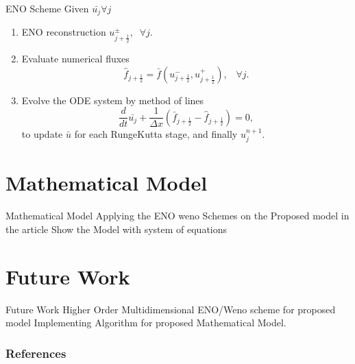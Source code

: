 \documentclass{beamer}
\begin{document}
\begin{frame}{ENO Scheme}
    Given $\bar{u_j} \forall j$ 
    \begin{enumerate}
        \item ENO reconstruction $u^{\pm}_{j+\frac{1}{2}},\;\; \forall j$.
        
        \item Evaluate numerical fluxes
        \begin{equation}
            \hat{f}_{j+\frac{1}{2}} = \bar{f}(u^-_{j+\frac{1}{2}}, u^+_{j+\frac{1}{2}}), \;\;\; \forall j.
        \end{equation}
        
        \item Evolve the ODE system by method of lines
        \begin{equation}
            \frac{d}{dt} \bar{u_j} + \frac{1}{\Delta x} \left( \bar{f}_{j+\frac{1}{2}} - \hat{f}_{j+\frac{1}{2}}  \right) = 0,
        \end{equation}
        to update $\bar{u}$ for each RungeKutta stage, and finally $u^{n+1}_j$.
    \end{enumerate}
\end{frame}

\section{Mathematical Model}
\begin{frame}{Mathematical Model}
    Applying the ENO weno Schemes on the Proposed model in the article
    Show the Model with system of equations
\end{frame}


\section{Future Work}
\begin{frame}{Future Work}
    Higher Order Multidimensional ENO/Weno scheme for proposed model
    Implementing Algorithm for proposed Mathematical Model.
\end{frame}


\begin{frame}[allowframebreaks]
        \frametitle{References}
        
        
\end{frame}
\end{document}
